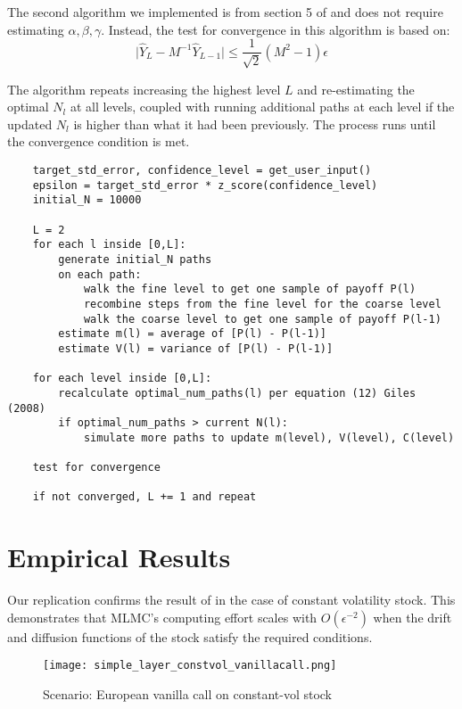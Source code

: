 \documentclass{article}
\begin{document}
    The second algorithm we implemented is from section 5 of \cite{giles08} and does not require estimating $\alpha, \beta, \gamma$. Instead, the test for convergence in this algorithm is based on:
    $$\mid \widehat{Y}_L - M^{-1} \widehat{Y}_{L-1} \mid \leq \frac{1}{\sqrt{2}} (M^2 - 1) \epsilon$$
    
    The algorithm repeats increasing the highest level $L$ and re-estimating the optimal $N_l$ at all levels, coupled with running additional paths at each level if the updated $N_l$ is higher than what it had been previously. The process runs until the convergence condition is met.
    
    \begin{lstlisting}
	target_std_error, confidence_level = get_user_input()
    epsilon = target_std_error * z_score(confidence_level)
	initial_N = 10000
    
    L = 2
    for each l inside [0,L]:
        generate initial_N paths
        on each path:
            walk the fine level to get one sample of payoff P(l)
            recombine steps from the fine level for the coarse level
            walk the coarse level to get one sample of payoff P(l-1)
        estimate m(l) = average of [P(l) - P(l-1)]
        estimate V(l) = variance of [P(l) - P(l-1)]       
        
    for each level inside [0,L]:
        recalculate optimal_num_paths(l) per equation (12) Giles (2008)    
        if optimal_num_paths > current N(l):
            simulate more paths to update m(level), V(level), C(level)
    
    test for convergence
    
    if not converged, L += 1 and repeat    
    \end{lstlisting}
	
\section{Empirical Results}
    Our replication confirms the result of \cite{giles08} in the case of constant volatility stock. This demonstrates that MLMC's computing effort scales with $O(\epsilon^{-2})$ when the drift and diffusion functions of the stock satisfy the required conditions. 
    \begin{figure}
        \texttt{[image: simple\_layer\_constvol\_vanillacall.png]}
        \caption{Scenario: European vanilla call on constant-vol stock}
        \label{fig:constvol_vanillacall}
    \end{figure}
    
\end{document}
